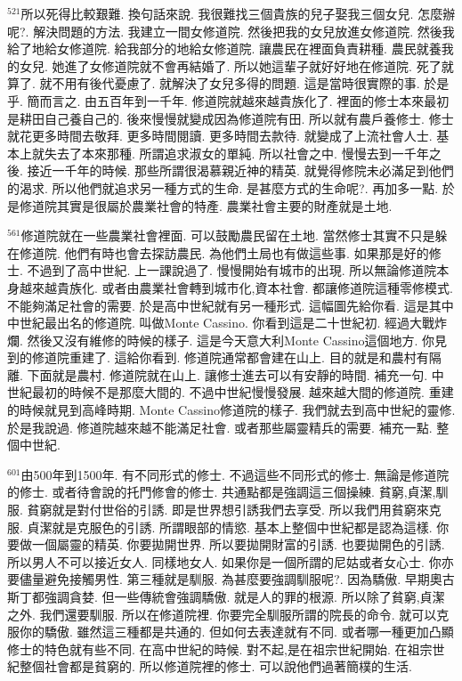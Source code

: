 \documentclass{book}
\begin{document}
$^{521}$所以死得比較艱難.
換句話來說.
我很難找三個貴族的兒子娶我三個女兒.
怎麼辦呢?.
解決問題的方法.
我建立一間女修道院.
然後把我的女兒放進女修道院.
然後我給了地給女修道院.
給我部分的地給女修道院.
讓農民在裡面負責耕種.
農民就養我的女兒.
她進了女修道院就不會再結婚了.
所以她這輩子就好好地在修道院.
死了就算了.
就不用有後代憂慮了.
就解決了女兒多得的問題.
這是當時很實際的事.
於是乎.
簡而言之.
由五百年到一千年.
修道院就越來越貴族化了.
裡面的修士本來最初是耕田自己養自己的.
後來慢慢就變成因為修道院有田.
所以就有農戶養修士.
修士就花更多時間去敬拜.
更多時間閱讀.
更多時間去款待.
就變成了上流社會人士.
基本上就失去了本來那種.
所謂追求淑女的單純.
所以社會之中.
慢慢去到一千年之後.
接近一千年的時候.
那些所謂很渴慕親近神的精英.
就覺得修院未必滿足到他們的渴求.
所以他們就追求另一種方式的生命.
是甚麼方式的生命呢?.
再加多一點.
於是修道院其實是很屬於農業社會的特產.
農業社會主要的財產就是土地.

$^{561}$修道院就在一些農業社會裡面.
可以鼓勵農民留在土地.
當然修士其實不只是躲在修道院.
他們有時也會去探訪農民.
為他們土局也有做這些事.
如果那是好的修士.
不過到了高中世紀.
上一課說過了.
慢慢開始有城市的出現.
所以無論修道院本身越來越貴族化.
或者由農業社會轉到城市化,資本社會.
都讓修道院這種零修模式.
不能夠滿足社會的需要.
於是高中世紀就有另一種形式.
這幅圖先給你看.
這是其中中世紀最出名的修道院.
叫做Monte Cassino.
你看到這是二十世紀初.
經過大戰炸爛.
然後又沒有維修的時候的樣子.
這是今天意大利Monte Cassino這個地方.
你見到的修道院重建了.
這給你看到.
修道院通常都會建在山上.
目的就是和農村有隔離.
下面就是農村.
修道院就在山上.
讓修士進去可以有安靜的時間.
補充一句.
中世紀最初的時候不是那麼大間的.
不過中世紀慢慢發展.
越來越大間的修道院.
重建的時候就見到高峰時期.
Monte Cassino修道院的樣子.
我們就去到高中世紀的靈修.
於是我說過.
修道院越來越不能滿足社會.
或者那些屬靈精兵的需要.
補充一點.
整個中世紀.

$^{601}$由500年到1500年.
有不同形式的修士.
不過這些不同形式的修士.
無論是修道院的修士.
或者待會說的托門修會的修士.
共通點都是強調這三個操練.
貧窮,貞潔,馴服.
貧窮就是對付世俗的引誘.
即是世界想引誘我們去享受.
所以我們用貧窮來克服.
貞潔就是克服色的引誘.
所謂眼部的情慾.
基本上整個中世紀都是認為這樣.
你要做一個屬靈的精英.
你要拋開世界.
所以要拋開財富的引誘.
也要拋開色的引誘.
所以男人不可以接近女人.
同樣地女人.
如果你是一個所謂的尼姑或者女心士.
你亦要儘量避免接觸男性.
第三種就是馴服.
為甚麼要強調馴服呢?.
因為驕傲.
早期奧古斯丁都強調貪婪.
但一些傳統會強調驕傲.
就是人的罪的根源.
所以除了貧窮,貞潔之外.
我們還要馴服.
所以在修道院裡.
你要完全馴服所謂的院長的命令.
就可以克服你的驕傲.
雖然這三種都是共通的.
但如何去表達就有不同.
或者哪一種更加凸顯修士的特色就有些不同.
在高中世紀的時候.
對不起,是在祖宗世紀開始.
在祖宗世紀整個社會都是貧窮的.
所以修道院裡的修士.
可以說他們過著簡樸的生活.
\end{document}
